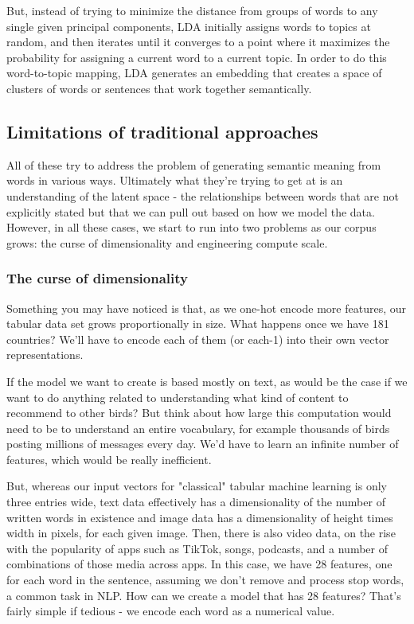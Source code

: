 \documentclass[11pt]{diazessay} %
\begin{document}
But, instead of trying to minimize the distance from groups of words to any single given principal components, LDA initially assigns words to topics at random, and then iterates until it converges to a point where it maximizes the probability for assigning a current word to a current topic.  In order to do this word-to-topic mapping, LDA generates an embedding that creates a space of clusters of words or sentences that work together semantically. 

\subsection{Limitations of traditional approaches}
 
 All of these try to address the problem of generating semantic meaning from words in various ways. Ultimately what they're trying to get at is an understanding of the latent space - the relationships between words that are not explicitly stated but that we can pull out based on how we model the data. However, in all these cases, we start to run into two problems as our corpus grows: the curse of dimensionality and engineering compute scale. 
 
 \subsubsection{The curse of dimensionality}

Something you may have noticed is that, as we one-hot encode more features, our tabular data set grows proportionally in size. What happens once we have 181 countries? We'll have to encode each of them (or each-1) into their own vector representations.

If the model we want to create is based mostly on text, as would be the case if we want to do anything related to understanding what kind of content to recommend to other birds? But think about how large this computation would need to be to understand an entire vocabulary, for example thousands of birds posting millions of messages every day. We'd have to learn an infinite number of features, which would be really inefficient.

But, whereas our input vectors for "classical" tabular machine learning is only three entries wide, text data effectively has a dimensionality of the number of written words in existence and image data has a dimensionality of height times width in pixels, for each given image. Then, there is also video data, on the rise with the popularity of apps such as TikTok, songs, podcasts, and a number of combinations of those media across apps.  In this case, we have 28 features, one for each word in the sentence, assuming we don't remove and process stop words, a common task in NLP.  How can we create a model that has 28 features? That's fairly simple if tedious - we encode each word as a numerical value. 
\end{document}
